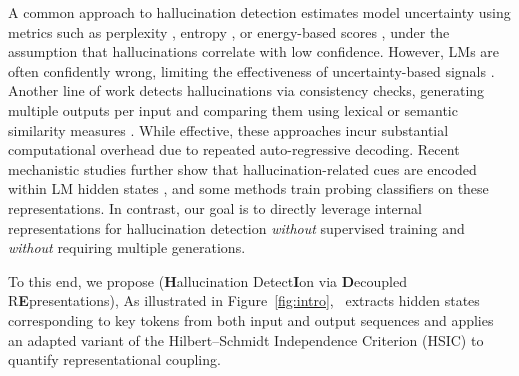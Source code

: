 A common approach to hallucination detection estimates model uncertainty using metrics such as perplexity \citep{ren_out--distribution_2023}, entropy \citep{malinin_uncertainty_2021}, or energy-based scores \citep{liu_energy-based_2020}, under the assumption that hallucinations correlate with low confidence. However, LMs are often confidently wrong, limiting the effectiveness of uncertainty-based signals \citep{simhi2025trustmeimwrong}. Another line of work detects hallucinations via consistency checks, generating multiple outputs per input and comparing them using lexical or semantic similarity measures \citep{lin_towards_2022, manakul2023selfcheckgptzeroresourceblackboxhallucination}. While effective, these approaches incur substantial computational overhead due to repeated auto-regressive decoding. Recent mechanistic studies further show that hallucination-related cues are encoded within LM hidden states \citep{azaria2023internalstatellmknows, ji-etal-2024-llm, duan2024llmsknowhallucinationempirical}, and some methods train probing classifiers on these representations. In contrast, our goal is to directly leverage internal representations for hallucination detection \emph{without} supervised training and \emph{without} requiring multiple generations.

To this end, we propose \textbf{\method} (\textbf{H}allucination Detect\textbf{I}on via \textbf{D}ecoupled R\textbf{E}presentations),  As illustrated in Figure~\ref{fig:intro}, \method~extracts hidden states corresponding to key tokens from both input and output sequences and applies an adapted variant of the Hilbert--Schmidt Independence Criterion (HSIC) to quantify representational coupling.  


